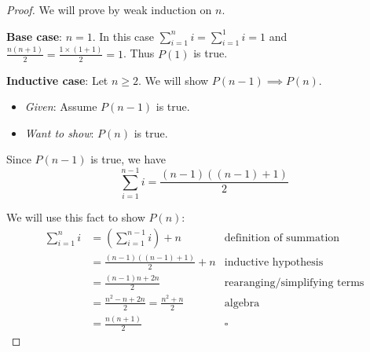 \documentclass[titlepage]{article}
\begin{document}
\begin{proof}
We will prove by weak induction on $n$.

\textbf{Base case}: $n=1$.  In this case $\sum_{i=1}^n i = \sum_{i=1}^1 i = 1$ and $\frac{n(n+1)}{2} = \frac{1 \times (1+1)}{2} = 1$.  Thus $P(1)$ is true.


\textbf{Inductive case}: Let $n \geq 2$.  We will show $P(n-1) \implies P(n)$.
\begin{itemize}
\item \emph{Given}: Assume $P(n-1)$ is true.
\item \emph{Want to show}: $P(n)$ is true.
\end{itemize}
Since $P(n-1)$ is true, we have
$$\sum_{i=1}^{n-1} i = \frac{(n-1)((n-1)+1)}{2}$$

We will use this fact to show $P(n)$:
\begin{align*}
\sum_{i=1}^{n} i &= \left( \sum_{i=1}^{n-1} i \right) + n & \text{definition of summation} \\
&= \frac{(n-1)((n-1)+1)}{2} + n & \text{inductive hypothesis} \\
&= \frac{(n-1)n + 2n}{2} & \text{rearanging/simplifying terms} \\
&= \frac{n^2 - n + 2n}{2} = \frac{n^2 + n}{2}  & \text{algebra} \\
&= \frac{n(n + 1)}{2}  & \square
\end{align*}
\end{proof}
\end{document}
